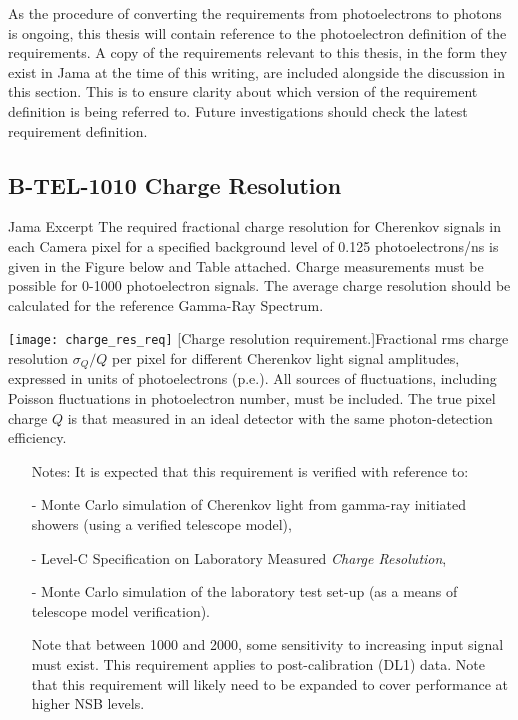 As the procedure of converting the requirements from photoelectrons to photons is ongoing, this thesis will contain reference to the photoelectron definition of the requirements. A copy of the requirements relevant to this thesis, in the form they exist in Jama at the time of this writing, are included alongside the discussion in this section. This is to ensure clarity about which version of the requirement definition is being referred to. Future investigations should check the latest requirement definition. \vfill

\subsection{B-TEL-1010 Charge Resolution} \label{section:cr}

\begin{requirement}{Jama Excerpt} 
	The required fractional charge resolution for Cherenkov signals in each Camera pixel for a specified background level of 0.125 photoelectrons/ns is given in the Figure below and Table attached. Charge measurements must be possible for 0-1000 photoelectron signals. The average charge resolution should be calculated for the reference Gamma-Ray Spectrum.
    
	\centering\texttt{[image: charge\_res\_req]}
	[Charge resolution requirement.]{Fractional rms charge resolution $\sigma_Q/Q$ per pixel for different Cherenkov light signal amplitudes, expressed in units of photoelectrons (p.e.). All sources of fluctuations, including Poisson fluctuations in photoelectron number, must be included. The true pixel charge $Q$ is that measured in an ideal detector with the same photon-detection efficiency. }\label{fig:charge_res_req}
    
\begin{itemize}
\item [Notes:] It is expected that this requirement is verified with reference to:

- Monte Carlo simulation of Cherenkov light from gamma-ray initiated showers (using a verified telescope model),

- Level-C Specification on Laboratory Measured \textit{Charge Resolution},

- Monte Carlo simulation of the laboratory test set-up (as a means of telescope model verification).

Note that between \SI{1000}{\pe} and \SI{2000}{\pe}, some sensitivity to increasing input signal must exist. \newline
This requirement applies to post-calibration (DL1) data. \newline
Note that this requirement will likely need to be expanded to cover performance at higher NSB levels.
\end{itemize}
\end{requirement}

